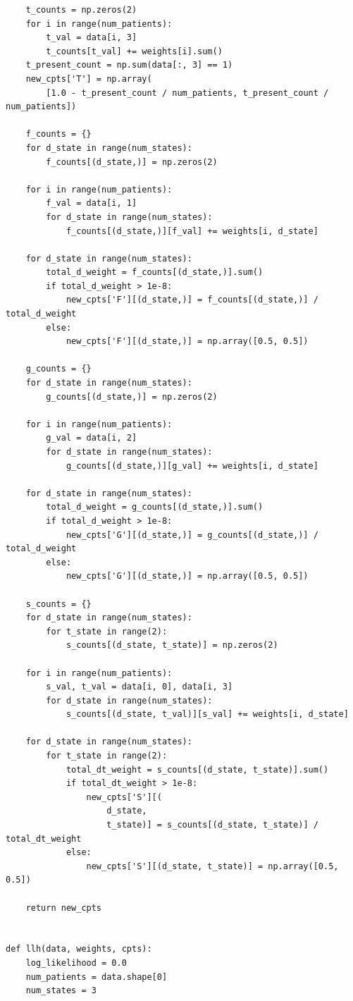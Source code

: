 \documentclass[11pt]{article}
\begin{document}
\begin{verbatim}
    t_counts = np.zeros(2)
    for i in range(num_patients):
        t_val = data[i, 3]
        t_counts[t_val] += weights[i].sum()
    t_present_count = np.sum(data[:, 3] == 1)
    new_cpts['T'] = np.array(
        [1.0 - t_present_count / num_patients, t_present_count / num_patients])

    f_counts = {}
    for d_state in range(num_states):
        f_counts[(d_state,)] = np.zeros(2)

    for i in range(num_patients):
        f_val = data[i, 1]
        for d_state in range(num_states):
            f_counts[(d_state,)][f_val] += weights[i, d_state]

    for d_state in range(num_states):
        total_d_weight = f_counts[(d_state,)].sum()
        if total_d_weight > 1e-8:
            new_cpts['F'][(d_state,)] = f_counts[(d_state,)] / total_d_weight
        else:
            new_cpts['F'][(d_state,)] = np.array([0.5, 0.5])

    g_counts = {}
    for d_state in range(num_states):
        g_counts[(d_state,)] = np.zeros(2)

    for i in range(num_patients):
        g_val = data[i, 2]
        for d_state in range(num_states):
            g_counts[(d_state,)][g_val] += weights[i, d_state]

    for d_state in range(num_states):
        total_d_weight = g_counts[(d_state,)].sum()
        if total_d_weight > 1e-8:
            new_cpts['G'][(d_state,)] = g_counts[(d_state,)] / total_d_weight
        else:
            new_cpts['G'][(d_state,)] = np.array([0.5, 0.5])

    s_counts = {}
    for d_state in range(num_states):
        for t_state in range(2):
            s_counts[(d_state, t_state)] = np.zeros(2)

    for i in range(num_patients):
        s_val, t_val = data[i, 0], data[i, 3]
        for d_state in range(num_states):
            s_counts[(d_state, t_val)][s_val] += weights[i, d_state]

    for d_state in range(num_states):
        for t_state in range(2):
            total_dt_weight = s_counts[(d_state, t_state)].sum()
            if total_dt_weight > 1e-8:
                new_cpts['S'][(
                    d_state,
                    t_state)] = s_counts[(d_state, t_state)] / total_dt_weight
            else:
                new_cpts['S'][(d_state, t_state)] = np.array([0.5, 0.5])

    return new_cpts


def llh(data, weights, cpts):
    log_likelihood = 0.0
    num_patients = data.shape[0]
    num_states = 3


\end{verbatim}
\end{document}
